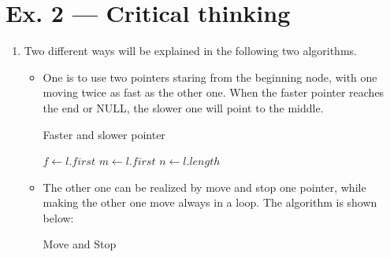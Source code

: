 \documentclass[12pt, a4paper]{article}
\begin{document}
\section*{Ex. 2 --- Critical thinking}
\begin{enumerate}
    \item Two different ways will be explained in the following two algorithms.
          \begin{itemize}
              \item One is  to use two pointers staring from the beginning node, with one moving twice as fast as the other one. 
                    When the faster pointer reaches the end or NULL, the slower one will point to the middle.

                    \begin{algorithm}[!htb]
                        \caption{Faster and slower pointer}
                        \BlankLine

                        $f \leftarrow l.first$\;
                        $m \leftarrow l.first$\;
                        $n \leftarrow l.length$\;
                        \;
                    \end{algorithm}
              \item The other one can be realized by move and stop one pointer, while making the other one move always in a loop. 
                    The algorithm is shown below:

                    \begin{algorithm}[!htb]
                        \caption{Move and Stop}
                        \BlankLine


\end{algorithm}
\end{itemize}
\end{enumerate}
\end{document}
